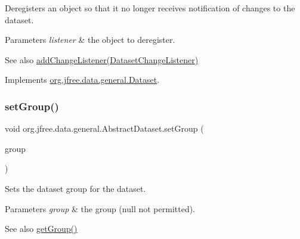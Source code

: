Deregisters an object so that it no longer receives notification of changes to the dataset.


\begin{DoxyParams}{Parameters}
{\em listener} & the object to deregister.\\
\hline
\end{DoxyParams}
\begin{DoxySeeAlso}{See also}
\mbox{\hyperlink{classorg_1_1jfree_1_1data_1_1general_1_1_abstract_dataset_a98ccd0af41c59cd8fe50543376d0faf9}{add\+Change\+Listener(\+Dataset\+Change\+Listener)}} 
\end{DoxySeeAlso}


Implements \mbox{\hyperlink{interfaceorg_1_1jfree_1_1data_1_1general_1_1_dataset_a47cc3418a0f49e520f72f8411601afc4}{org.\+jfree.\+data.\+general.\+Dataset}}.

\mbox{\label{classorg_1_1jfree_1_1data_1_1general_1_1_abstract_dataset_ab0442a73adac8fbb69594378b5e354b0}} 
\subsubsection{\texorpdfstring{set\+Group()}{setGroup()}}
{\footnotesize\ttfamily void org.\+jfree.\+data.\+general.\+Abstract\+Dataset.\+set\+Group (\begin{DoxyParamCaption}\item[{\mbox{\hyperlink{classorg_1_1jfree_1_1data_1_1general_1_1_dataset_group}{Dataset\+Group}}}]{group }\end{DoxyParamCaption})}

Sets the dataset group for the dataset.


\begin{DoxyParams}{Parameters}
{\em group} & the group ({\ttfamily null} not permitted).\\
\hline
\end{DoxyParams}
\begin{DoxySeeAlso}{See also}
\mbox{\hyperlink{classorg_1_1jfree_1_1data_1_1general_1_1_abstract_dataset_a8461feb0ca75008e174e5bf72a56f01d}{get\+Group()}} 
\end{DoxySeeAlso}


